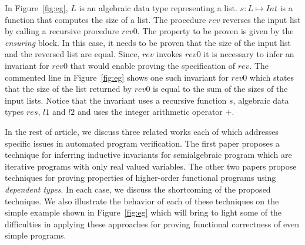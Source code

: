 %
In Figure~\ref{fig:eg}, $L$ is an algebraic data type representing a list. $s: L \mapsto Int$ is a function 
that computes the size of a list. The procedure $rev$ reverses the input list by calling a recursive procedure 
$rev0$. The property to be proven is given by the \emph{ensuring} block. In this case, it needs to be proven
that the size of the input list and the reversed list are equal. Since, $rev$ invokes $rev0$ it is necessary to 
infer an invariant for $rev0$ that would enable proving the specification of $rev$. 
The commented line in Figure~\ref{fig:eg} shows one such invariant for $rev0$ which states that
the size of the list returned by $rev0$ is equal to the sum of the sizes of the input lists.
Notice that the invariant uses a recursive function $s$, algebraic data types $res$, $l1$ and $l2$
and uses the integer arithmetic operator $+$.

In the rest of article, we discuss three related works each of which addresses specific issues in
automated program verification. The first paper proposes a technique for inferring inductive invariants
for semialgebraic program which are iterative programs with only real valued variables. The other two 
papers propose techniques for proving properties of higher-order functional programs using \emph{dependent types}.
In each case, we discuss the shortcoming of the proposed technique. 
We also illustrate the behavior of each of these techniques on the simple example shown 
in Figure~\ref{fig:eg} which will bring to light some of the difficulties in applying these approaches for
proving functional correctness of even simple programs.